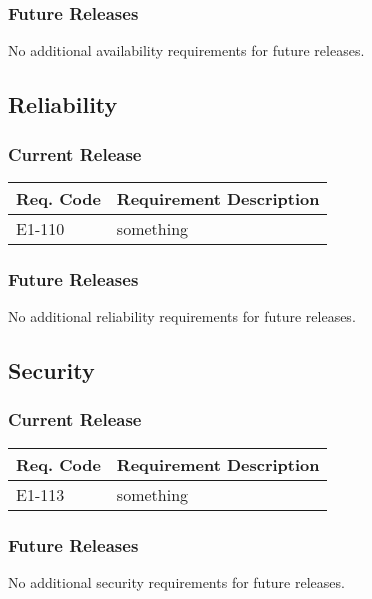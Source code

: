 \documentclass[12pt]{article}
\begin{document}
\subsubsection{Future Releases}
No additional availability requirements for future releases.


\subsection{Reliability}

\subsubsection{Current Release}

\begin{table}[!h]
	\begin{tabular}{| l | l|}
		\hline
		\textbf{Req. Code} & \textbf{Requirement Description}\\
		\hline
		E1-110	& something\\
		\hline
	\end{tabular}
	\label{tab:ReliabilityRequirements}
\end{table}

\subsubsection{Future Releases}
No additional reliability requirements for future releases.


\subsection{Security}

\subsubsection{Current Release}

\begin{table}[!h]
	\begin{tabular}{| l | l |}
		\hline
		\textbf{Req. Code} & \textbf{Requirement Description}\\
		\hline
		E1-113	& something\\
		\hline
	\end{tabular}
	\label{tab:SecurityRequirements}
\end{table}

\subsubsection{Future Releases}
No additional security requirements for future releases.
\end{document}

